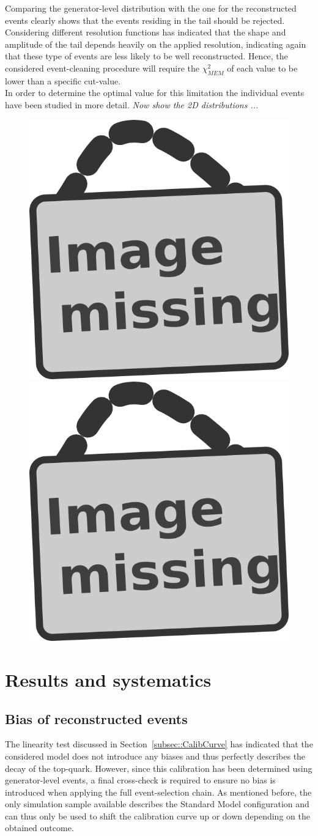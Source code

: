 Comparing the generator-level distribution with the one for the reconstructed events clearly shows that the events residing in the tail should be rejected. Considering different resolution functions has indicated that the shape and amplitude of the tail depends heavily on the applied resolution, indicating again that these type of events are less likely to be well reconstructed.
Hence, the considered event-cleaning procedure will require the $\chi^{2}_{MEM}$ of each value to be lower than a specific cut-value. 
\\
In order to determine the optimal value for this limitation the individual events have been studied in more detail.
\textit{Now show the 2D distributions ...}
\begin{figure}[h!t]
 \centering
 \includegraphics[width = 0.35 \textwidth]{image.png}
 \includegraphics[width = 0.35 \textwidth]{image.png}
 \caption{} \label{fig::SMLik2D}
\end{figure}

\section{Results and systematics} \label{sec::Meas}

\subsection{Bias of reconstructed events}
The linearity test discussed in Section~\ref{subsec::CalibCurve} has indicated that the considered model does not introduce any biases and thus perfectly describes the decay of the top-quark. However, since this calibration has been determined using generator-level events, a final cross-check is required to ensure no bias is introduced when applying the full event-selection chain.
As mentioned before, the only simulation sample available describes the Standard Model configuration and can thus only be used to shift the calibration curve up or down depending on the obtained outcome.
\\
